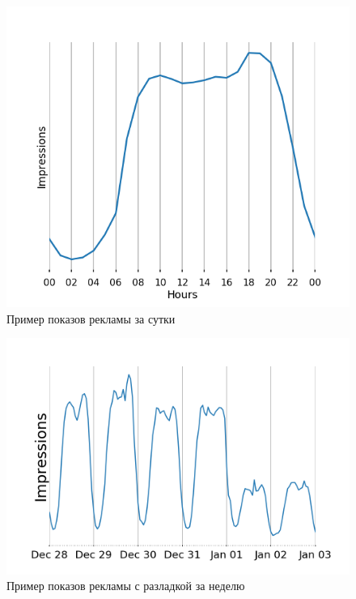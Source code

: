 \documentclass[%
12pt,
master,  %
natbib,      %
subf,        %
substylefile = spbu.rtx,
href,        %
colorlinks,  %
]{disser}
\begin{document}
\begin{figure}[!hhh]
	\begin{center}
		\includegraphics[width=12cm]{examples_day}
	\end{center}
	\vspace{-5mm}\caption{Пример показов рекламы за сутки}
	\label{fig:examples_day}
\end{figure}
 
\begin{figure}[!hhh]
	\begin{center}
		\includegraphics[width=12cm]{cp_mean_2}
	\end{center}
	\vspace{-5mm}\caption{Пример показов рекламы с разладкой за неделю}
	\label{fig:examples_month}
\end{figure}
\end{document}
